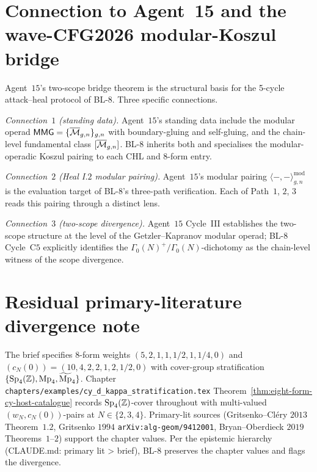 \section{Connection to Agent~15 and the wave-CFG2026 modular-Koszul
bridge}
\label{sec:bl8-agent15-connection}

Agent~$15$'s two-scope bridge theorem is the structural basis for the
5-cycle attack--heal protocol of BL-$8$. Three specific connections.

\emph{Connection~$1$ (standing data).} Agent~$15$'s standing data
include the modular operad $\mathsf{MMG} = \{\overline{\mathcal{M}}_{g, n}\}_{g, n}$
with boundary-gluing and self-gluing, and the chain-level fundamental
class $[\overline{\mathcal{M}}_{g, n}]$. BL-$8$ inherits both and specialises the
modular-operadic Koszul pairing to each CHL and 8-form entry.

\emph{Connection~$2$ (Heal I.$2$ modular pairing).} Agent~$15$'s
modular pairing $\langle -, - \rangle^{\mathrm{mod}}_{g, n}$ is the
evaluation target of BL-$8$'s three-path verification. Each of
Path~$1$, $2$, $3$ reads this pairing through a distinct lens.

\emph{Connection~$3$ (two-scope divergence).} Agent~$15$ Cycle~III
establishes the two-scope structure at the level of the Getzler--Kapranov
modular operad; BL-$8$ Cycle~C$5$ explicitly identifies the
$\Gamma_0(N)^+ / \Gamma_0(N)$-dichotomy as the chain-level witness of
the scope divergence.

\section{Residual primary-literature divergence note}
\label{sec:bl8-brief-primary-lit-divergence}

The brief specifies 8-form weights $(5, 2, 1, 1, 1/2, 1, 1/4, 0)$ and
$(c_N(0)) = (10, 4, 2, 2, 1, 2, 1/2, 0)$ with cover-group stratification
$\{\mathrm{Sp}_{4}(\mathbb{Z}), \mathrm{Mp}_{4}, \widetilde{\mathrm{Mp}}_{4}\}$. Chapter
\texttt{chapters/examples/cy\_d\_kappa\_stratification.tex}
Theorem~\ref{thm:eight-form-cy-host-catalogue} records $\mathrm{Sp}_{4}(\mathbb{Z})$-cover
throughout with multi-valued $(w_N, c_N(0))$-pairs at $N \in \{2, 3, 4\}$.
Primary-lit sources (Gritsenko--Cl\'ery $2013$ Theorem~$1.2$, Gritsenko
$1994$ \texttt{arXiv:alg-geom/9412001}, Bryan--Oberdieck $2019$
Theorems~$1$--$2$) support the chapter values. Per the epistemic
hierarchy (CLAUDE.md: primary lit > brief), BL-$8$ preserves the
chapter values and flags the divergence.

